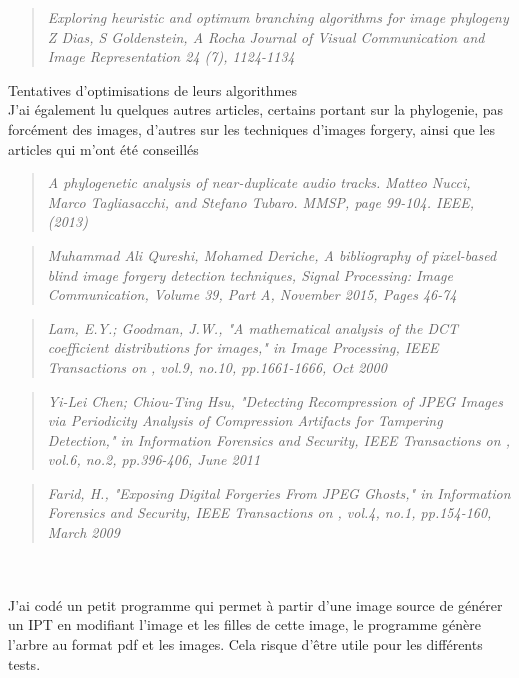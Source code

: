 \documentclass[11pt]{article}
\begin{document}
\begin{quote}
\emph{Exploring heuristic and optimum branching algorithms for image phylogeny}
\emph{Z Dias, S Goldenstein, A Rocha}
\emph{Journal of Visual Communication and Image Representation 24 (7), 1124-1134}
\end{quote}
Tentatives d'optimisations de leurs algorithmes
\\ 

J'ai également lu quelques autres articles, certains portant sur la phylogenie, pas forcément des images, d'autres sur les techniques d'images forgery, ainsi que les articles qui m'ont été conseillés

\begin{quote}
\emph{A phylogenetic analysis of near-duplicate audio tracks.}
\emph{Matteo Nucci, Marco Tagliasacchi, and Stefano Tubaro. MMSP, page 99-104. IEEE, (2013)}
\end{quote}

\begin{quote}
\emph{Muhammad Ali Qureshi, Mohamed Deriche, A bibliography of pixel-based blind image forgery detection techniques, Signal Processing: Image Communication, Volume 39, Part A, November 2015, Pages 46-74}
\end{quote}

\begin{quote}
\emph{Lam, E.Y.; Goodman, J.W., "A mathematical analysis of the DCT coefficient distributions for images," in Image Processing, IEEE Transactions on , vol.9, no.10, pp.1661-1666, Oct 2000}
\end{quote}

\begin{quote}
\emph{Yi-Lei Chen; Chiou-Ting Hsu, "Detecting Recompression of JPEG Images via Periodicity Analysis of Compression Artifacts for Tampering Detection," in Information Forensics and Security, IEEE Transactions on , vol.6, no.2, pp.396-406, June 2011}
\end{quote}

\begin{quote}
\emph{Farid, H., "Exposing Digital Forgeries From JPEG Ghosts," in Information Forensics and Security, IEEE Transactions on , vol.4, no.1, pp.154-160, March 2009}
\end{quote}

\\ \\
J'ai codé un petit programme qui permet à partir d'une image source de générer un IPT en modifiant l'image et les filles de cette image, le programme génère l'arbre au format pdf et les images. Cela risque d'être utile pour les différents tests.
\end{document}
